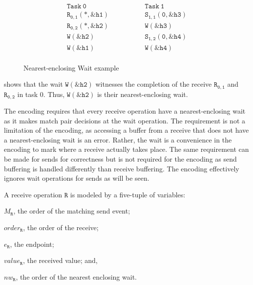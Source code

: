 \begin{figure}[t]
\[
\begin{array}{l|l}
\;\;\;\;\;\;\;\;\mathtt{Task\ 0}\;\;\;\;\;\;\;\; & \;\;\;\;\;\;\;\; \mathtt{Task\ 1}\;\;\;\;\;\;\;\; \\
\hline
\;\;\;\;\;\;\;\;\mathtt{R_{0,1}(*,\&h1)}\;\;\;\;\;\;\;\; & \;\;\;\;\;\;\;\; \mathtt{S_{1,1}(0,\&h3)}\;\;\;\;\;\;\;\; \\
\;\;\;\;\;\;\;\;\mathtt{R_{0,2}(*,\&h2)}\;\;\;\;\;\;\;\; & \;\;\;\;\;\;\;\; \mathtt{W{(\&h3)}}\;\;\;\;\;\;\;\; \\
\;\;\;\;\;\;\;\;\mathtt{W{(\&h2)}}\;\;\;\;\;\;\;\; & \;\;\;\;\;\;\;\; \mathtt{S_{1,2}(0,\&h4)}\;\;\;\;\;\;\;\; \\
\;\;\;\;\;\;\;\;\mathtt{W{(\&h1)}}\;\;\;\;\;\;\;\; & \;\;\;\;\;\;\;\; \mathtt{W{(\&h4)}}\;\;\;\;\;\;\;\; \\
\end{array}
\]
\caption{Nearest-enclosing Wait example} \label{fig:nw}
\end{figure}

 shows that the wait $\mathtt{W{(\&h2)}}$
witnesses the completion of the receive $\mathtt{R_{0,1}}$ and
$\mathtt{R_{0,2}}$ in task 0. Thus, $\mathtt{W{(\&h2)}}$ is their
nearest-enclosing wait.

The encoding requires that every receive operation have a
nearest-enclosing wait as it makes match pair decisions at the wait
operation. The requirement is not a limitation of the encoding, as
accessing a buffer from a receive that does not have a
nearest-enclosing wait is an error. Rather, the wait is a convenience
in the encoding to mark where a receive actually takes place. The same
requirement can be made for sends for correctness but is not required
for the encoding as send buffering is handled differently than receive
buffering.  The encoding effectively ignores wait operations for sends
as will be seen.

\begin{definition}[Receive] \label{def:rcv}
A receive operation $\mathtt{R}$ is modeled by a five-tuple of variables:
\begin{compactenum}
\item $M_\mathtt{R}$, the order of the matching send event;

\item $\mathit{order}_\mathtt{R}$, the order of the receive;

\item $e_\mathtt{R}$, the endpoint;

\item $\mathit{value}_\mathtt{R}$, the received value; and,

\item $\mathit{nw}_\mathtt{R}$, the order of the nearest enclosing wait.
\end{compactenum}
\end{definition}

